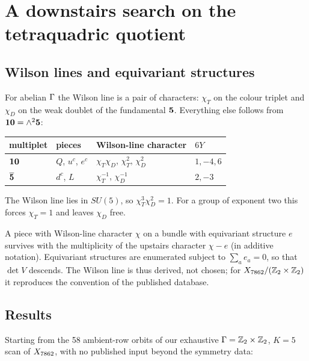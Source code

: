 \section{A downstairs search on the tetraquadric quotient}
\label{sec:downstairs}

\subsection{Wilson lines and equivariant structures}

For abelian $\Gamma$ the Wilson line is a pair of characters: $\chi_T$ on the colour
triplet and $\chi_D$ on the weak doublet of the fundamental $\mathbf{5}$. Everything
else follows from $\mathbf{10}=\wedge^2\mathbf{5}$:

\begin{center}\small
\begin{tabular}{@{}llll@{}}
\toprule
multiplet & pieces & Wilson-line character & $6Y$ \\
\midrule
$\mathbf{10}$ & $Q$, $u^c$, $e^c$ & $\chi_T\chi_D$, $\chi_T^2$, $\chi_D^2$ & $1,-4,6$ \\
$\overline{\mathbf{5}}$ & $d^c$, $L$ & $\chi_T^{-1}$, $\chi_D^{-1}$ & $2,-3$ \\
\bottomrule
\end{tabular}
\end{center}

\begin{lemma}\label{lem:wilson}
The Wilson line lies in $SU(5)$, so $\chi_T^3\chi_D^2=1$. For a group of exponent
two this forces $\chi_T=1$ and leaves $\chi_D$ free.
\end{lemma}

A piece with Wilson-line character $\chi$ on a bundle with equivariant structure
$e$ survives with the multiplicity of the upstairs character $\chi-e$ (in
additive notation). Equivariant structures are enumerated subject to
$\sum_ae_a=0$, so that $\det V$ descends. The Wilson line is thus derived, not
chosen; for $X_{7862}/(\mathbb{Z}_2\times\mathbb{Z}_2)$ it reproduces the convention of the published
database.

\subsection{Results}

Starting from the 58 ambient-row orbits of our exhaustive $\Gamma=\mathbb{Z}_2\times\mathbb{Z}_2$,
$K=5$ scan of $X_{7862}$, with no published input beyond the symmetry data:

